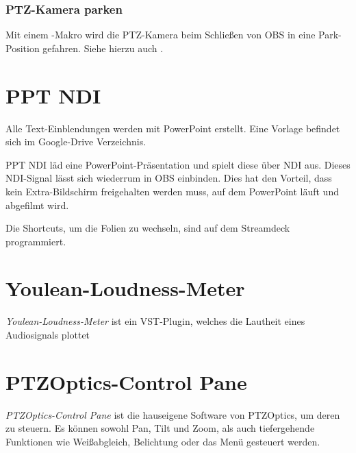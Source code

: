 			\subsubsection{PTZ-Kamera parken}
				Mit einem -Makro wird die \Gls{PTZ-Kamera} beim Schließen von OBS in eine Park-Position gefahren.
				Siehe hierzu auch .

				\section{PPT NDI}
		Alle Text-Einblendungen werden mit PowerPoint erstellt.
		Eine Vorlage befindet sich im Google-Drive Verzeichnis.

		PPT NDI läd eine PowerPoint-Präsentation und spielt diese über \Gls{NDI} aus.
		Dieses \Gls{NDI}-Signal lässt sich wiederrum in \Gls{OBS} einbinden.
		Dies hat den Vorteil, dass kein Extra-Bildschirm freigehalten werden muss, auf dem PowerPoint läuft und abgefilmt wird.

		Die Shortcuts, um die Folien zu wechseln, sind auf dem Streamdeck programmiert.
	\section{Youlean-Loudness-Meter}
		\textit{Youlean-Loudness-Meter} ist ein \Gls{VST-Plugin}, welches die \Gls{Lautheit} eines Audiosignals plottet
	\section{PTZOptics-Control Pane}
		\textit{PTZOptics-Control Pane} ist die hauseigene Software von PTZOptics, um deren  zu steuern.
		Es können sowohl Pan, Tilt und Zoom, als auch tiefergehende Funktionen wie Weißabgleich, Belichtung oder das Menü gesteuert werden.